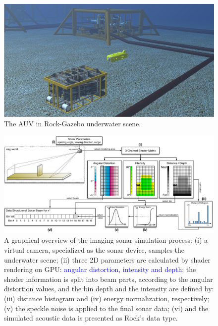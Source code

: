 \documentclass[final,5p,times]{elsarticle}
\begin{document}
\begin{figure}[t]
    \includegraphics[width=\columnwidth]{figs/uwscene}
    \centering
    \captionsetup{justification=justified}
    \caption{The AUV in Rock-Gazebo underwater scene.}
    \label{fig:uwscene}
\end{figure}


\begin{figure}[t]
    \includegraphics[width=0.85\paperwidth]{figs/sonar_sim}
    \centering
    \captionsetup{justification=justified}
    \caption{A graphical overview of the imaging sonar simulation process: (i) a virtual camera, specialized as the sonar device, samples the underwater scene; (ii) three 2D parameters are calculated by shader rendering on GPU: \textcolor{blue}{angular distortion, intensity and depth}; the shader information is split into beam parts, according to the angular distortion values, and the bin depth and the intensity are defined by: (iii) distance histogram and (iv) energy normalization, respectively; (v) the speckle noise is applied to the final sonar data; (vi) and the simulated acoustic data is presented as Rock's data type.}
    \label{fig:sonar_sim}
\end{figure}
\end{document}
